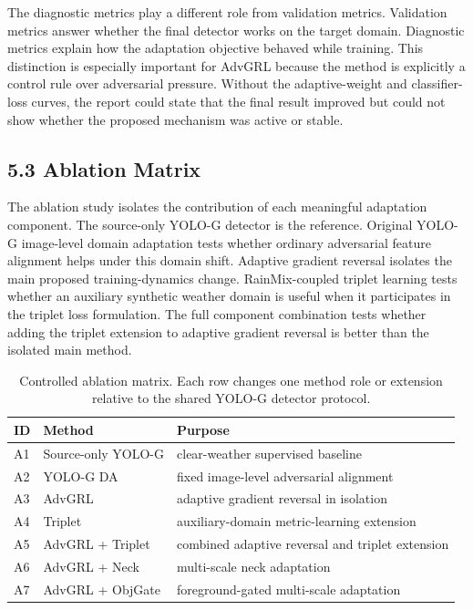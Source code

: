 \documentclass[
  11pt,
]{article}
\begin{document}
The diagnostic metrics play a different role from validation metrics.
Validation metrics answer whether the final detector works on the target
domain. Diagnostic metrics explain how the adaptation objective behaved
while training. This distinction is especially important for AdvGRL
because the method is explicitly a control rule over adversarial
pressure. Without the adaptive-weight and classifier-loss curves, the
report could state that the final result improved but could not show
whether the proposed mechanism was active or stable.

\hypertarget{ablation-matrix}{%
\subsection{5.3 Ablation Matrix}\label{ablation-matrix}}

The ablation study isolates the contribution of each meaningful
adaptation component. The source-only YOLO-G detector is the reference.
Original YOLO-G image-level domain adaptation tests whether ordinary
adversarial feature alignment helps under this domain shift. Adaptive
gradient reversal isolates the main proposed training-dynamics change.
RainMix-coupled triplet learning tests whether an auxiliary synthetic
weather domain is useful when it participates in the triplet loss
formulation. The full component combination tests whether adding the
triplet extension to adaptive gradient reversal is better than the
isolated main method.

\begin{table}[!t]
\centering
\caption{Controlled ablation matrix. Each row changes one method role or extension relative to the shared YOLO-G detector protocol.}
\label{tab:ablation_matrix}
\small
\setlength{\tabcolsep}{5pt}
\begin{tabular}{llp{}}
\toprule
ID & Method & Purpose \\
\midrule
A1 & Source-only YOLO-G & clear-weather supervised baseline \\
A2 & YOLO-G DA & fixed image-level adversarial alignment \\
A3 & AdvGRL & adaptive gradient reversal in isolation \\
A4 & Triplet & auxiliary-domain metric-learning extension \\
A5 & AdvGRL + Triplet & combined adaptive reversal and triplet extension \\
A6 & AdvGRL + Neck & multi-scale neck adaptation \\
A7 & AdvGRL + ObjGate & foreground-gated multi-scale adaptation \\
\bottomrule
\end{tabular}
\end{table}
\end{document}
